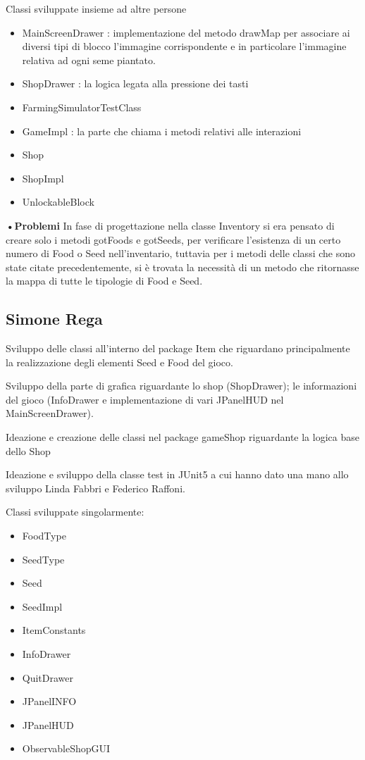 \documentclass[a4paper,12pt]{report}
\begin{document}
Classi sviluppate insieme ad altre persone
{
	\begin{itemize}
		\item MainScreenDrawer : implementazione del metodo drawMap per associare ai diversi tipi di blocco l'immagine corrispondente e in particolare l'immagine relativa ad ogni seme piantato.
		\item ShopDrawer : la logica legata alla pressione dei tasti
		\item FarmingSimulatorTestClass 
		\item GameImpl : la parte che chiama i metodi relativi alle interazioni 
		\item Shop
		\item ShopImpl
		\item UnlockableBlock
	\end{itemize}
}

\hfill\break

\textbf{•Problemi}\hfill\break
In fase di progettazione nella classe Inventory si era pensato di creare solo i metodi gotFoods e gotSeeds, per verificare l’esistenza di un certo numero di Food o Seed nell’inventario, tuttavia per i metodi delle classi che sono state citate precedentemente, si è trovata la necessità di un metodo che ritornasse la mappa di tutte le tipologie di Food e Seed.

\subsection{Simone Rega}
Sviluppo delle classi all'interno del package Item che riguardano principalmente la realizzazione degli elementi Seed e Food del gioco.

Sviluppo della parte di grafica riguardante lo shop (ShopDrawer); le informazioni del gioco (InfoDrawer e implementazione di vari JPanelHUD nel MainScreenDrawer).

Ideazione e creazione delle classi nel package gameShop riguardante la logica base dello Shop

Ideazione e sviluppo della classe test in JUnit5 a cui hanno dato una mano allo sviluppo Linda Fabbri e Federico Raffoni.

\hfill\break
Classi sviluppate singolarmente:
{
\begin{itemize}
	\item FoodType
	\item SeedType
	\item Seed
	\item SeedImpl
	\item ItemConstants
	\item InfoDrawer
	\item QuitDrawer
	\item JPanelINFO
	\item JPanelHUD
	\item ObservableShopGUI
\end{itemize}
}
\hfill\break
\end{document}
